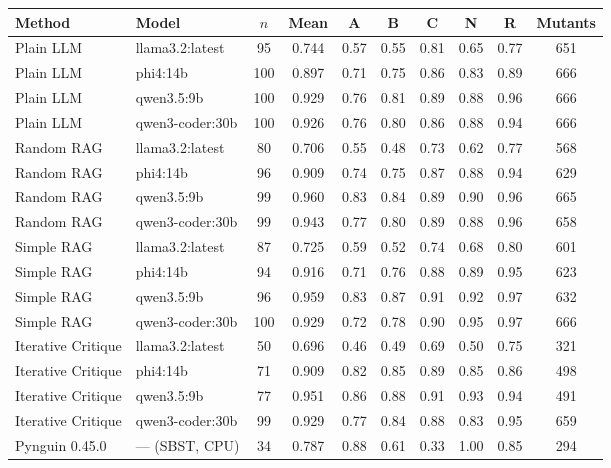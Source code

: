 \begin{tabular}{@{}llcccccccc@{}}
\toprule
Method & Model & $n$ & Mean & A & B & C & N & R & Mutants \\
\midrule
Plain LLM & llama3.2:latest & 95 & 0.744 & 0.57 & 0.55 & 0.81 & 0.65 & 0.77 & 651 \\
Plain LLM & phi4:14b & 100 & 0.897 & 0.71 & 0.75 & 0.86 & 0.83 & 0.89 & 666 \\
Plain LLM & qwen3.5:9b & 100 & 0.929 & 0.76 & 0.81 & 0.89 & 0.88 & 0.96 & 666 \\
Plain LLM & qwen3-coder:30b & 100 & 0.926 & 0.76 & 0.80 & 0.86 & 0.88 & 0.94 & 666 \\
\midrule
Random RAG & llama3.2:latest & 80 & 0.706 & 0.55 & 0.48 & 0.73 & 0.62 & 0.77 & 568 \\
Random RAG & phi4:14b & 96 & 0.909 & 0.74 & 0.75 & 0.87 & 0.88 & 0.94 & 629 \\
Random RAG & qwen3.5:9b & 99 & 0.960 & 0.83 & 0.84 & 0.89 & 0.90 & 0.96 & 665 \\
Random RAG & qwen3-coder:30b & 99 & 0.943 & 0.77 & 0.80 & 0.89 & 0.88 & 0.96 & 658 \\
\midrule
Simple RAG & llama3.2:latest & 87 & 0.725 & 0.59 & 0.52 & 0.74 & 0.68 & 0.80 & 601 \\
Simple RAG & phi4:14b & 94 & 0.916 & 0.71 & 0.76 & 0.88 & 0.89 & 0.95 & 623 \\
Simple RAG & qwen3.5:9b & 96 & 0.959 & 0.83 & 0.87 & 0.91 & 0.92 & 0.97 & 632 \\
Simple RAG & qwen3-coder:30b & 100 & 0.929 & 0.72 & 0.78 & 0.90 & 0.95 & 0.97 & 666 \\
\midrule
Iterative Critique & llama3.2:latest & 50 & 0.696 & 0.46 & 0.49 & 0.69 & 0.50 & 0.75 & 321 \\
Iterative Critique & phi4:14b & 71 & 0.909 & 0.82 & 0.85 & 0.89 & 0.85 & 0.86 & 498 \\
Iterative Critique & qwen3.5:9b & 77 & 0.951 & 0.86 & 0.88 & 0.91 & 0.93 & 0.94 & 491 \\
Iterative Critique & qwen3-coder:30b & 99 & 0.929 & 0.77 & 0.84 & 0.88 & 0.83 & 0.95 & 659 \\
\midrule
Pynguin 0.45.0 & --- (SBST, CPU) & 34 & 0.787 & 0.88 & 0.61 & 0.33 & 1.00 & 0.85 & 294 \\
\bottomrule
\end{tabular}
